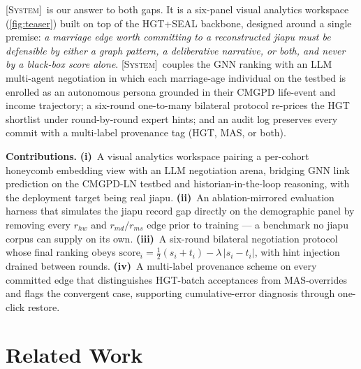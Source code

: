 \documentclass[review]{vgtc}                  %
\newcommand{\system}{\textsc{[System]}\xspace}
\begin{document}
\system\ is our answer to both gaps. It is a six-panel visual
analytics workspace (\cref{fig:teaser}) built on top of the HGT+SEAL
backbone, designed around a single premise: \emph{a marriage edge
worth committing to a reconstructed jiapu must be defensible by either
a graph pattern, a deliberative narrative, or both, and never by a
black-box score alone}. \system\ couples the GNN ranking with an LLM
multi-agent negotiation in which each marriage-age individual on the
testbed is enrolled as an autonomous persona grounded in their CMGPD
life-event and income trajectory; a six-round one-to-many bilateral
protocol re-prices the HGT shortlist under round-by-round expert
hints; and an audit log preserves every commit with a multi-label
provenance tag (\textsf{HGT}, \textsf{MAS}, or both).

\noindent\textbf{Contributions.}
\textbf{(i)}~A visual analytics workspace pairing a per-cohort
honeycomb embedding view with an LLM negotiation arena, bridging GNN
link prediction on the CMGPD-LN testbed and historian-in-the-loop
reasoning, with the deployment target being real jiapu.
\textbf{(ii)}~An ablation-mirrored evaluation harness that simulates
the jiapu record gap directly on the demographic panel by removing
every $r_{hw}$ and $r_{md}/r_{ms}$ edge prior to training --- a
benchmark no jiapu corpus can supply on its own.
\textbf{(iii)}~A six-round bilateral negotiation protocol whose final
ranking obeys $\mathrm{score}_i = \tfrac12 (s_i + t_i)
- \lambda\,|s_i - t_i|$, with hint injection drained between rounds.
\textbf{(iv)}~A multi-label provenance scheme on every committed edge
that distinguishes HGT-batch acceptances from MAS-overrides and flags
the convergent case, supporting cumulative-error diagnosis through
one-click restore.

\section{Related Work}
\label{sec:related}
\end{document}
